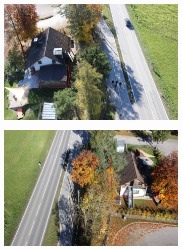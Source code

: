 \documentclass[remotesensing,article,accept,moreauthors,pdftex,10pt,a4paper]{mdpi}
\theoremstyle{mdpi}
\newcounter{ex}
\newcounter{re}
\begin{document}
\begin{figure}[H]
\begin{subfigure}[tbp]{0.31\columnwidth}
           \caption[]{}%
           {{\small }}   
           \label{fig:5f}
       \end{subfigure} 
       \begin{subfigure}[tbp]{0.31\columnwidth}
           \centering
           \includegraphics[width=\textwidth]{optimize/IMG_1367_xy.png}
           \caption[]{}%
           {{\small }}
           \label{fig:5g}
       \end{subfigure}
       \begin{subfigure}[tbp]{0.31\columnwidth}  
           \centering 
           \includegraphics[width=\textwidth]{optimize/IMG_1604_xy.png}
           \caption[]{}%
           {{\small }}    
           \label{fig:5h}
       \end{subfigure}
       \begin{subfigure}[tbp]{0.31\columnwidth}  
           \centering 

\end{subfigure}
\end{figure}
\end{document}
